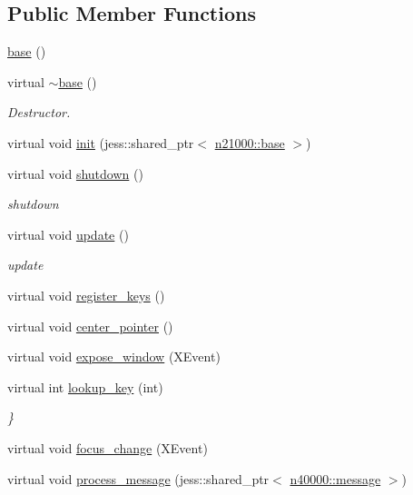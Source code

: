 \subsection*{Public Member Functions}
\begin{DoxyCompactItemize}
\item 
\hyperlink{classnebula_1_1platform_1_1window_1_1lin_1_1base_a9441236d249988aee2ae24c70acc2d25}{base} ()
\item 
virtual \hyperlink{classnebula_1_1platform_1_1window_1_1lin_1_1base_aee19a7238b38b14e69a87d7e9c95aa13}{$\sim$base} ()
\begin{DoxyCompactList}\small\item\em Destructor. \item\end{DoxyCompactList}\item 
virtual void \hyperlink{classnebula_1_1platform_1_1window_1_1lin_1_1base_adc69f1c00bd65bf27f33f502cd026ffa}{init} (jess::shared\_\-ptr$<$ \hyperlink{classnebula_1_1platform_1_1platform_1_1base}{n21000::base} $>$)
\item 
virtual void \hyperlink{classnebula_1_1platform_1_1window_1_1lin_1_1base_a8541f8bd43b27bdf54c4951b5f2c76df}{shutdown} ()
\begin{DoxyCompactList}\small\item\em shutdown \item\end{DoxyCompactList}\item 
virtual void \hyperlink{classnebula_1_1platform_1_1window_1_1lin_1_1base_ab3a910d3a1f8b6d37d57461e02071f3f}{update} ()
\begin{DoxyCompactList}\small\item\em update \item\end{DoxyCompactList}\item 
virtual void \hyperlink{classnebula_1_1platform_1_1window_1_1lin_1_1base_ac42e5f39d083044ad4e6df1b94d6c621}{register\_\-keys} ()
\item 
virtual void \hyperlink{classnebula_1_1platform_1_1window_1_1lin_1_1base_ab6395e5c5f91c4f593fb912d2b67380a}{center\_\-pointer} ()
\item 
virtual void \hyperlink{classnebula_1_1platform_1_1window_1_1lin_1_1base_a3d02de6ccf6330049f1389e14c1650c0}{expose\_\-window} (XEvent)
\item 
virtual int \hyperlink{classnebula_1_1platform_1_1window_1_1lin_1_1base_af5ca9a6a75a661884dd934dc65ea59b2}{lookup\_\-key} (int)
\begin{DoxyCompactList}\small\item\em \} \item\end{DoxyCompactList}\item 
virtual void \hyperlink{classnebula_1_1platform_1_1window_1_1lin_1_1base_a9c10bd8e96d887a43e69c2593d17eeb5}{focus\_\-change} (XEvent)
\item 
virtual void \hyperlink{classnebula_1_1platform_1_1window_1_1lin_1_1base_aa0edb939ba175c67019eacdb5a576226}{process\_\-message} (jess::shared\_\-ptr$<$ \hyperlink{classnebula_1_1asio_1_1message}{n40000::message} $>$)
\end{DoxyCompactItemize}
